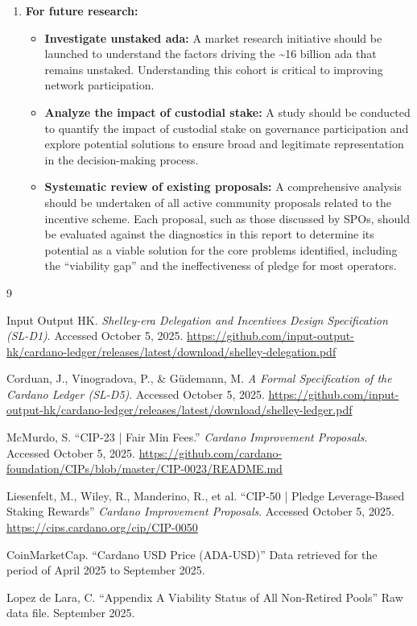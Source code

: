 \documentclass[11pt, letterpaper]{article}
\begin{document}
\begin{enumerate}
	\item \textbf{For future research:}
	      \begin{itemize}
		      \item \textbf{Investigate unstaked ada:} A market research initiative should be launched to understand
		            the factors driving the \textasciitilde16 billion ada that remains unstaked. Understanding this cohort
		            is critical to improving network participation.
		      \item \textbf{Analyze the impact of custodial stake:} A study should be conducted to quantify the impact
		            of custodial stake on governance participation and explore potential solutions to ensure broad and
		            legitimate representation in the decision-making process.
		      \item \textbf{Systematic review of existing proposals:} A comprehensive analysis should be undertaken of all
		            active community proposals related to the incentive scheme. Each proposal, such as those discussed
		            by SPOs, should be evaluated against the diagnostics in this report to determine its potential as a
		            viable solution for the core problems identified, including the ``viability gap'' and the ineffectiveness
		            of pledge for most operators.
	      \end{itemize}
\end{enumerate}

\newpage
\begin{thebibliography}{9}

	Input Output HK\@. \textit{Shelley-era Delegation and Incentives Design Specification (SL-D1)}.
	Accessed October 5, 2025.
	\url{https://github.com/input-output-hk/cardano-ledger/releases/latest/download/shelley-delegation.pdf}

	Corduan, J., Vinogradova, P., \& Güdemann, M. \textit{A Formal Specification of the Cardano Ledger (SL-D5)}.
	Accessed October 5, 2025.
	\url{https://github.com/input-output-hk/cardano-ledger/releases/latest/download/shelley-ledger.pdf}

	McMurdo, S. ``CIP-23 | Fair Min Fees.'' \textit{Cardano Improvement Proposals}.
	Accessed October 5, 2025. \url{https://github.com/cardano-foundation/CIPs/blob/master/CIP-0023/README.md}

	Liesenfelt, M., Wiley, R., Manderino, R., et al. ``CIP-50 | Pledge Leverage-Based Staking Rewards''
	\textit{Cardano Improvement Proposals}. Accessed October 5, 2025. \url{https://cips.cardano.org/cip/CIP-0050}

	CoinMarketCap. ``Cardano USD Price (ADA-USD)''
	Data retrieved for the period of April 2025 to September 2025.

	Lopez de Lara, C. ``Appendix A\: Viability Status of All Non-Retired Pools''
	Raw data file. September 2025.

\end{thebibliography}
\end{document}

